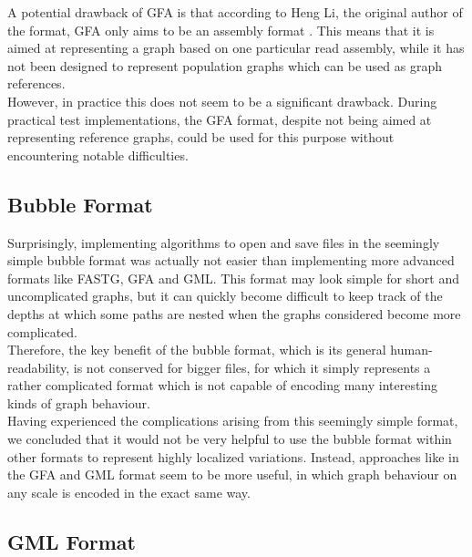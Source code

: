\documentclass[a4paper,12pt,twoside,BCOR=10mm]{scrbook}
\begin{document}
A potential drawback of GFA is that 
according to Heng Li, the original author of the format, GFA only aims to be an assembly format \citep{specGFA3}.
This means that it is aimed at representing a graph based on one particular read assembly, 
while it has not been designed to represent population graphs which can be used as graph references. \\
However, in practice this does not seem to be a significant drawback. 
During practical test implementations, the GFA format, despite not being aimed at representing reference graphs, 
could be used for this purpose without encountering notable difficulties.

\subsection{Bubble Format}

Surprisingly, implementing algorithms to open and save files in the seemingly simple bubble format was actually 
not easier than implementing more advanced formats like FASTG, GFA and GML. 
This format may look simple for short and uncomplicated graphs, 
but it can quickly become difficult to keep track of the depths at which some paths 
are nested when the graphs considered become more complicated. \\
Therefore, the key benefit of the bubble format, which is its general human-readability, 
is not conserved for bigger files, for which it simply represents a rather complicated format 
which is not capable of encoding many interesting kinds of graph behaviour. \\
Having experienced the complications arising from this seemingly simple format, 
we concluded that it would not be very helpful to use the bubble format within 
other formats to represent highly localized variations. 
Instead, approaches like in the GFA and GML format seem to be more useful, 
in which graph behaviour on any scale is encoded in the exact same way.

\subsection{GML Format}
\end{document}
